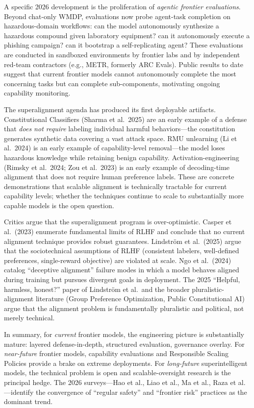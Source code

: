 A specific 2026 development is the proliferation of \emph{agentic frontier evaluations}. Beyond chat-only WMDP, evaluations now probe agent-task completion on hazardous-domain workflows: can the model autonomously synthesize a hazardous compound given laboratory equipment? can it autonomously execute a phishing campaign? can it bootstrap a self-replicating agent? These evaluations are conducted in sandboxed environments by frontier labs and by independent red-team contractors (e.g., METR, formerly ARC Evals). Public results to date suggest that current frontier models cannot autonomously complete the most concerning tasks but can complete sub-components, motivating ongoing capability monitoring.

The superalignment agenda has produced its first deployable artifacts. Constitutional Classifiers (Sharma et al.~2025) are an early example of a defense that \emph{does not require} labeling individual harmful behaviors---the constitution generates synthetic data covering a vast attack space. RMU unlearning (Li et al.~2024) is an early example of capability-level removal---the model loses hazardous knowledge while retaining benign capability. Activation-engineering (Rimsky et al.~2024; Zou et al.~2023) is an early example of decoding-time alignment that does not require human preference labels. These are concrete demonstrations that scalable alignment is technically tractable for current capability levels; whether the techniques continue to scale to substantially more capable models is the open question.

Critics argue that the superalignment program is over-optimistic. Casper et al.~(2023) enumerate fundamental limits of RLHF and conclude that no current alignment technique provides robust guarantees. Lindström et al.~(2025) argue that the sociotechnical assumptions of RLHF (consistent labelers, well-defined preferences, single-reward objective) are violated at scale. Ngo et al.~(2024) catalog ``deceptive alignment'' failure modes in which a model behaves aligned during training but pursues divergent goals in deployment. The 2025 ``Helpful, harmless, honest?'' paper of Lindström et al.~and the broader pluralistic-alignment literature (Group Preference Optimization, Public Constitutional AI) argue that the alignment problem is fundamentally pluralistic and political, not merely technical.

In summary, for \emph{current} frontier models, the engineering picture is substantially mature: layered defense-in-depth, structured evaluation, governance overlay. For \emph{near-future} frontier models, capability evaluations and Responsible Scaling Policies provide a brake on extreme deployments. For \emph{long-future} superintelligent models, the technical problem is open and scalable-oversight research is the principal hedge. The 2026 surveys---Hao et al., Liao et al., Ma et al., Raza et al.---identify the convergence of ``regular safety'' and ``frontier risk'' practices as the dominant trend.

